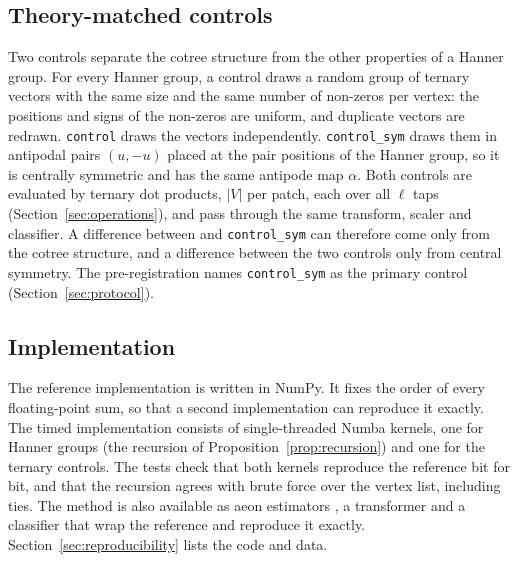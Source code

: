 \subsection{Theory-matched controls}
\label{sec:controls}

Two controls separate the cotree structure from the other properties of a Hanner group.
For every Hanner group, a control draws a random group of ternary vectors with the same
size and the same number of non-zeros per vertex: the positions and signs of the non-zeros
are uniform, and duplicate vectors are redrawn. \texttt{control} draws the vectors
independently. \texttt{control\_sym} draws them in antipodal pairs $(u,-u)$ placed at the
pair positions of the Hanner group, so it is centrally symmetric and has the same antipode
map $\alpha$. Both controls are evaluated by ternary dot products, $|V|$ per patch, each over all $\ell$
taps (Section~\ref{sec:operations}), and
pass through the same transform, scaler and classifier. A difference between \hh{} and
\texttt{control\_sym} can therefore come only from the cotree structure, and a difference
between the two controls only from central symmetry. The pre-registration names
\texttt{control\_sym} as the primary control (Section~\ref{sec:protocol}).

\subsection{Implementation}
\label{sec:implementation}

The reference implementation is written in NumPy. It fixes the order of every
floating-point sum, so that a second implementation can reproduce it exactly. The timed
implementation consists of single-threaded Numba kernels, one for Hanner groups (the
recursion of Proposition~\ref{prop:recursion}) and one for the ternary controls. The tests
check that both kernels reproduce the reference bit for bit, and that the recursion agrees
with brute force over the vertex list, including ties. The method is also available as
aeon estimators \citep{middlehurst2024aeon}, a transformer and a classifier that wrap the
reference and reproduce it exactly. Section~\ref{sec:reproducibility} lists the code and
data.
